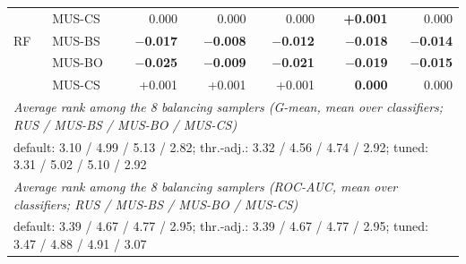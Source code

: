 \begin{table}[htbp]
\begin{tabular}{llrrrrr}
 & MUS-CS & 0.000 & 0.000 & 0.000 & \textbf{+0.001} & 0.000\\
\addlinespace
RF & MUS-BS & \textbf{$-$0.017} & \textbf{$-$0.008} & \textbf{$-$0.012} & \textbf{$-$0.018} & \textbf{$-$0.014}\\
 & MUS-BO & \textbf{$-$0.025} & \textbf{$-$0.009} & \textbf{$-$0.021} & \textbf{$-$0.019} & \textbf{$-$0.015}\\
 & MUS-CS & +0.001 & +0.001 & +0.001 & \textbf{0.000} & 0.000\\
\midrule
\multicolumn{7}{l}{\emph{Average rank among the 8 balancing samplers (G-mean, mean over classifiers; RUS / MUS-BS / MUS-BO / MUS-CS)}}\\
\multicolumn{7}{l}{default: 3.10 / 4.99 / 5.13 / 2.82; thr.-adj.: 3.32 / 4.56 / 4.74 / 2.92; tuned: 3.31 / 5.02 / 5.10 / 2.92}\\
\multicolumn{7}{l}{\emph{Average rank among the 8 balancing samplers (ROC-AUC, mean over classifiers; RUS / MUS-BS / MUS-BO / MUS-CS)}}\\
\multicolumn{7}{l}{default: 3.39 / 4.67 / 4.77 / 2.95; thr.-adj.: 3.39 / 4.67 / 4.77 / 2.95; tuned: 3.47 / 4.88 / 4.91 / 3.07}\\
\bottomrule
\end{tabular}
\end{table}
